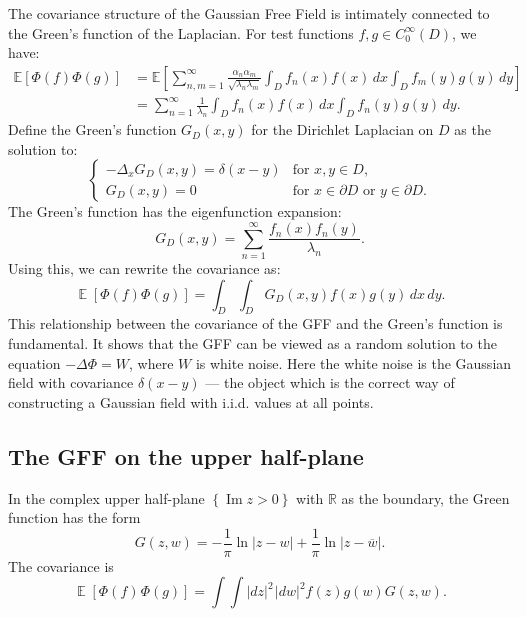 \documentclass[letterpaper,11pt,oneside,reqno]{book}
\numberwithin{equation}{chapter}  %
\newcommand{\ssp}{\hspace{1pt}}
\theoremstyle{definition}
\begin{document}
The covariance structure of the Gaussian Free Field is intimately connected to the Green's function of the Laplacian. For test functions $f, g \in C_0^{\infty}(D)$, we have:
\begin{align}
    \mathbb{E}[\Phi(f) \Phi(g)] &= \mathbb{E}\left[\sum_{n,m=1}^{\infty} \frac{\alpha_n \alpha_m}{\sqrt{\lambda_n \lambda_m}} \int_D f_n(x) f(x) \, dx \int_D f_m(y) g(y) \, dy\right] \\
    &= \sum_{n=1}^{\infty} \frac{1}{\lambda_n} \int_D f_n(x) f(x) \, dx \int_D f_n(y) g(y) \, dy.
\end{align}
Define the Green's function $G_D(x, y)$ for the Dirichlet Laplacian on $D$ as the solution to:
\begin{equation}
    \begin{cases}
        -\Delta_x G_D(x, y) = \delta(x - y) & \text{for } x, y \in D, \\
        G_D(x, y) = 0 & \text{for } x \in \partial D \text{ or } y \in \partial D.
    \end{cases}
\end{equation}
The Green's function has the eigenfunction expansion:
\begin{equation}
    G_D(x, y) = \sum_{n=1}^{\infty} \frac{f_n(x) f_n(y)}{\lambda_n}.
\end{equation}
Using this, we can rewrite the covariance as:
\begin{equation}
	\operatorname{\mathbb{E}}[\Phi(f) \Phi(g)] = \int_D \int_D G_D(x, y) f(x) g(y) \, dx \, dy.
\end{equation}
This relationship between the covariance of the GFF and the Green's function is fundamental. It shows that the GFF can be viewed as a random solution to the equation $-\Delta \Phi = W$, where $W$ is white noise.
Here the white noise is the Gaussian
field with covariance $\delta(x-y)$ --- the object which is the
correct way of constructing a Gaussian field with i.i.d.
values at all points.

\subsection{The GFF on the upper half-plane}

In the complex upper half-plane
$\left\{ \operatorname{Im}z>0 \right\}$
with $\mathbb{R}$ as the boundary,
the Green function has the form
\begin{equation*}
	G(z,w) = -\frac{1}{\pi}\ln|z-w| + \frac{1}{\pi}\ln|z-\overline{w}|.
\end{equation*}
The covariance is
\begin{equation*}
	\operatorname{\mathbb{E}}
	\left[ \Phi(f)\ssp \Phi(g) \right]=
	\int\int|dz|^2\ssp |dw|^2
	f(z)g(w) G(z,w) .
\end{equation*}
\end{document}
